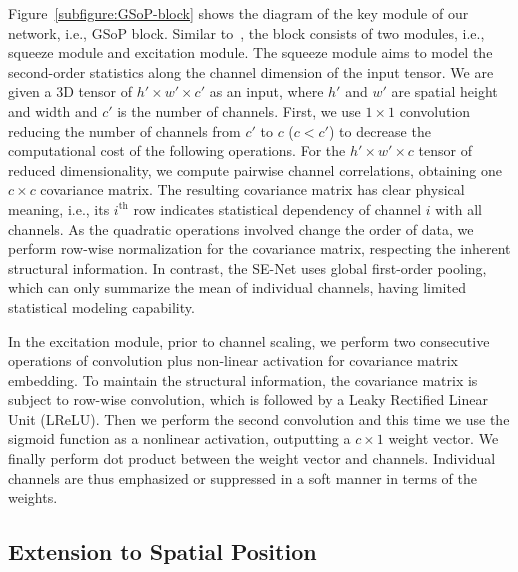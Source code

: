 \documentclass[10pt,twocolumn,letterpaper]{article}
\begin{document}
Figure~\ref{subfigure:GSoP-block} shows the diagram of the key module of our network, i.e., GSoP block. Similar to~\cite{Hu_2018_CVPR_SE},  the block  consists of two modules, i.e., squeeze module and excitation module. The squeeze module aims to model the  second-order statistics along the channel dimension of the input tensor. We are given a 3D  tensor of $h'\times w' \times c'$ as an input, where $h'$ and $w'$ are spatial height and width  and $c'$ is the number of channels. First, we use  $1\times 1$ convolution reducing the number of channels from $c'$ to $c$ ($c<c'$) to decrease the computational cost of the following operations. For the   $h'\times w' \times c$ tensor of reduced dimensionality, we compute pairwise channel correlations, obtaining one $c\times c$ covariance matrix. The resulting covariance matrix has clear physical meaning, i.e., its  $i^\mathrm{th}$ row indicates statistical dependency of channel $i$  with all channels. As the quadratic operations involved change  the order of data, we perform row-wise normalization for the covariance matrix, respecting the inherent structural information. In contrast, the SE-Net  uses global first-order pooling,  which can only summarize the mean  of individual channels, having limited statistical  modeling capability. 

In the excitation module, prior to channel scaling, we perform two consecutive operations of convolution plus non-linear activation for covariance matrix embedding. To maintain the structural information, the covariance matrix is subject to row-wise convolution, which is followed by a Leaky Rectified Linear Unit (LReLU). Then we perform the second convolution and this time we use the sigmoid function as a nonlinear activation, outputting  a $c\times 1$ weight vector. We finally perform dot product between the weight vector and  channels. Individual channels are thus  emphasized or suppressed in a soft manner in terms of the weights. 

   
\subsection{Extension to Spatial Position}\label{subsection:position-block}
\end{document}

